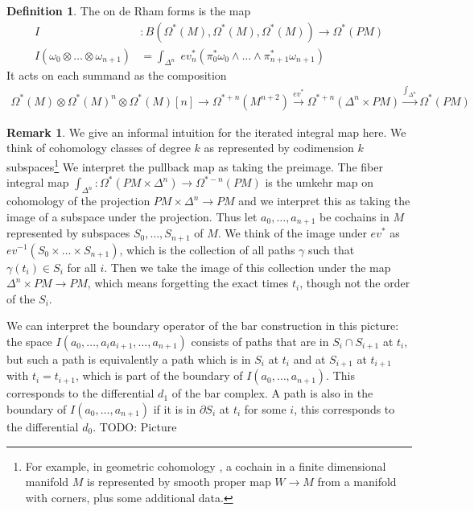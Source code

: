 \documentclass{scrartcl}
\let\emph\relax
\theoremstyle{plain}
\theoremstyle{definition}
\newtheorem{definition}[theorem]{Definition}
\newtheorem{remark}[theorem]{Remark}
\newcommand{\abs}[1]{\left\lvert#1\right\rvert}
\newcommand{\isect}{\mathbin{\cap}}
\let\xto\xrightarrow
\begin{document}
\begin{definition}
The \emph{iterated integral} on de Rham forms is the map 
\begin{align*}
    I&\colon B(\Omega^*(M), \Omega^*(M), \Omega^*(M)) \to \Omega^*(PM) \\
    I(\omega_0 \otimes \dots \otimes\omega_{n+1}) &= \int_{\Delta^n}\phantom{|} ev_n^*(\pi_0^*\omega_0\wedge\dots\wedge\pi_{n+1}^*\omega_{n+1})
\end{align*}
It acts on each summand as the composition
\begin{align*}
    \Omega^*(M)\otimes\Omega^*(M)^n\otimes\Omega^*(M)[n]\to \Omega^{*+n}(M^{n+2})\xto{ev^*}\Omega^{*+n}(\Delta^n\times PM) \xto{\int_{\Delta^n}} \Omega^{*}(PM)
\end{align*}
\end{definition}

\begin{remark}
    We give an informal intuition for the iterated integral map here. We think of cohomology classes of degree $k$ as represented by codimension $k$ subspaces\footnote{For example, in geometric cohomology \cite{friedman2022foundations}, a cochain in a finite dimensional manifold $M$ is represented by smooth proper map $W\to M$ from a manifold with corners, plus some additional data. } We interpret the pullback map as taking the preimage. The fiber integral map $\int_{\Delta^n}\colon \Omega^*(PM\times \Delta^n)\to \Omega^{*-n}(PM)$ is the umkehr map on cohomology of the projection $PM\times \Delta^n\to PM$ and we interpret this as taking the image of a subspace under the projection. Thus let $a_0, \dots, a_{n+1}$ be cochains in $M$ represented by subspaces $S_0, \dots, S_{n+1}$ of $M$. We think of the image under $ev^*$ as $ev^{-1}(S_0\times\dots\times S_{n+1})$, which is the collection of all paths $\gamma$ such that $\gamma(t_i)\in S_i$ for all $i$. Then we take the image of this collection under the map $\Delta^n\times PM \to PM$, which means forgetting the exact times $t_i$, though not the order of the $S_i$. 
    
    We can interpret the boundary operator of the bar construction in this picture: the space $I(a_0, \dots, a_ia_{i+1},\dots, a_{n+1})$ consists of paths that are in $S_i\isect S_{i+1}$ at $t_i$, but such a path is equivalently a path which is in $S_i$ at $t_i$ and at $S_{i+1}$ at $t_{i+1}$ with $t_i=t_{i+1}$, which is part of the boundary of $I(a_0,\dots,a_{n+1})$. This corresponds to the differential $d_1$ of the bar complex. A path is also in the boundary of $I(a_0,\dots,a_{n+1})$ if it is in $\partial S_i$ at $t_i$ for some $i$, this corresponds to the differential $d_0$. TODO: Picture
\end{remark}
\end{document}
